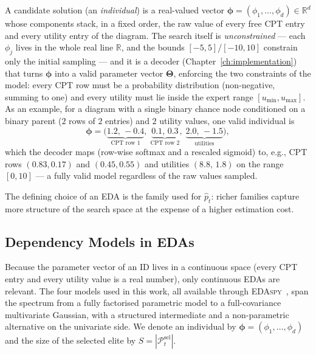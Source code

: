 A candidate solution (an \emph{individual}) is a real-valued vector
$\boldsymbol{\phi}=(\phi_1,\ldots,\phi_d)\in\mathbb{R}^d$ whose components stack,
in a fixed order, the raw value of every free CPT entry and every utility entry
of the diagram. The search itself is \emph{unconstrained} — each $\phi_j$ lives in the whole
real line $\mathbb{R}$, and the bounds $[-5,5]$/$[-10,10]$ constrain only the
initial sampling — and it is a decoder
(Chapter~\ref{ch:implementation}) that turns $\boldsymbol{\phi}$ into a valid
parameter vector $\boldsymbol{\Theta}$, enforcing the two constraints of the
model: every CPT row must be a probability distribution (non-negative, summing to
one) and every utility must lie inside the expert range $[u_{\min},u_{\max}]$.
As an example, for a diagram with a single binary chance node conditioned on a
binary parent ($2$ rows of $2$ entries) and $2$ utility values, one valid
individual is
\[
  \boldsymbol{\phi} =
  \bigl(\underbrace{1.2,\,-0.4}_{\text{CPT row }1},\;
        \underbrace{0.1,\,0.3}_{\text{CPT row }2},\;
        \underbrace{2.0,\,-1.5}_{\text{utilities}}\bigr),
\]
which the decoder maps (row-wise softmax and a rescaled sigmoid) to, e.g.,
CPT rows $(0.83,0.17)$ and $(0.45,0.55)$ and utilities $(8.8,\,1.8)$ on the range
$[0,10]$ — a fully valid model regardless of the raw values sampled.

The defining choice of an EDA is the family used for $\hat{p}_t$:
richer families capture more structure of the search space at the
expense of a higher estimation cost.

\subsection{Dependency Models in EDAs}

Because the parameter vector of an ID lives in a continuous space
(every CPT entry and every utility value is a real number), only
continuous EDAs are relevant. The four models used in this work,
all available through \textsc{EDAspy}~\cite{soloviev2024edaspy}, span the spectrum from a fully factorised parametric model to a
full-covariance multivariate Gaussian, with a structured intermediate
and a non-parametric alternative on the univariate side. We denote an individual by $\boldsymbol{\phi}=(\phi_1,\ldots,\phi_d)$
and the size of the selected elite by
$S=|\mathcal{P}_t^{\text{sel}}|$.

